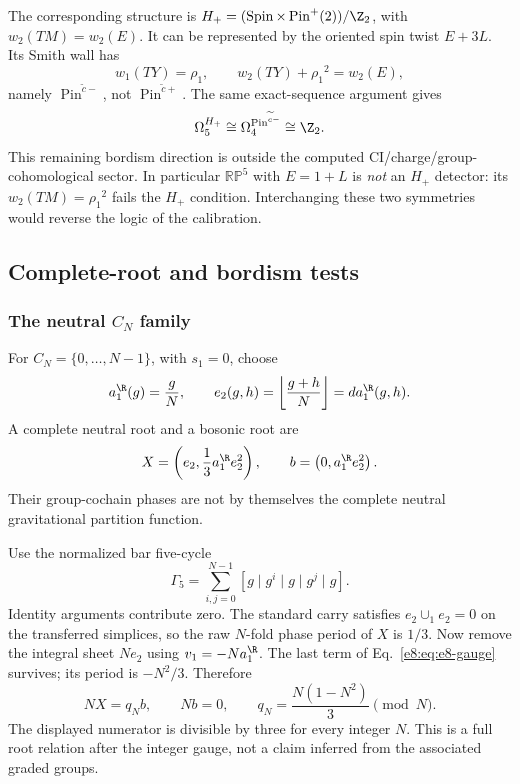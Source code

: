 The corresponding structure is
$H_+=(\operatorname{Spin}\times\operatorname{Pin}^+(2))/\Z_2$,
with $w_2(TM)=w_2(E)$. It can be represented by the oriented spin twist $E+3L$. Its Smith wall has
\begin{equation}
 w_1(TY)={\rho_1},\qquad w_2(TY)+{\rho_1}^2=w_2(E),
\end{equation}
namely $\operatorname{Pin}^{\widetilde c-}$, not $\operatorname{Pin}^{\widetilde c+}$. The same exact-sequence argument gives
\begin{equation}
                   \Omega_5^{H_+}\cong\Omega_4^{\operatorname{Pin}^{\widetilde c-}}
                        \cong\Z_2.
\end{equation}
This remaining bordism direction is outside the computed CI/charge/group-cohomological sector. In particular $\mathbb{RP}^5$ with $E=1+L$ is \emph{not} an $H_+$ detector: its $w_2(TM)={\rho_1}^2$ fails the $H_+$ condition. Interchanging these two symmetries would reverse the logic of the calibration.


\subsection{Complete-root and bordism tests}
\label{e8:sec:examples}
\subsubsection{The neutral $C_N$ family}
For $C_N=\{0,\ldots,N-1\}$, with $s_1=0$, choose
\begin{equation}
 a_1^{\R}(g)=\frac gN,\qquad
 e_2(g,h)=\left\lfloor\frac{g+h}{N}\right\rfloor=d a_1^{\R}(g,h).
 \label{e8:eq:cycliccarry}
\end{equation}
A complete neutral root and a bosonic root are
\begin{equation}
 X=\left(e_2,\frac13a_1^{\R}e_2^2\right),\qquad
 b=\left(0,a_1^{\R}e_2^2\right).
 \label{e8:eq:cyclicroots}
\end{equation}
Their group-cochain phases are not by themselves the complete neutral gravitational partition function.

Use the normalized bar five-cycle
\begin{equation}
 \Gamma_5=\sum_{i,j=0}^{N-1}[g\mid g^i\mid g\mid g^j\mid g].
 \label{e8:eq:cyclegamma}
\end{equation}
Identity arguments contribute zero. The standard carry satisfies $e_2\cup_1e_2=0$ on the transferred simplices, so the raw $N$-fold phase period of $X$ is $1/3$. Now remove the integral sheet $Ne_2$ using $v_1=-Na_1^{\R}$. The last term of Eq.~\eqref{e8:eq:e8-gauge} survives; its period is $-N^2/3$. Therefore
\begin{equation}
 NX=q_N b,\qquad Nb=0,\qquad
 q_N=\frac{N(1-N^2)}3\pmod N.
 \label{e8:eq:cyclicrelation}
\end{equation}
The displayed numerator is divisible by three for every integer $N$. This is a full root relation after the integer gauge, not a claim inferred from the associated graded groups.


